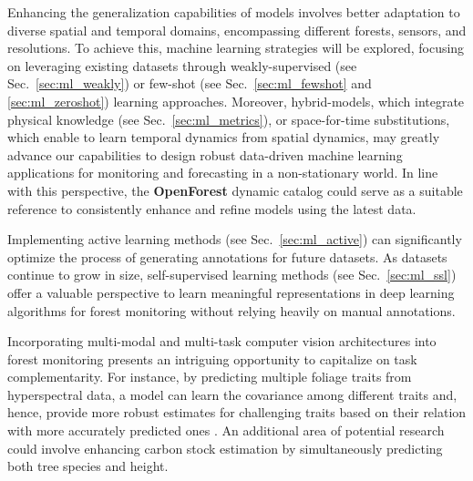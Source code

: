 \documentclass{CUP-JNL-DTM}%
\theoremstyle{definition}
\numberwithin{equation}{section}
\begin{document}
Enhancing the generalization capabilities of models involves better adaptation to diverse spatial and temporal domains, encompassing different forests, sensors, and resolutions. To achieve this, machine learning strategies will be explored, focusing on leveraging existing datasets through weakly-supervised (see Sec.~\ref{sec:ml_weakly}) or few-shot (see Sec.~\ref{sec:ml_fewshot} and \ref{sec:ml_zeroshot}) learning approaches. Moreover, hybrid-models, which integrate physical knowledge (see Sec.~\ref{sec:ml_metrics}), or space-for-time substitutions, which enable to learn temporal dynamics from spatial dynamics, may greatly advance our capabilities to design robust data-driven machine learning applications for monitoring and forecasting in a non-stationary world.
In line with this perspective, the \textbf{OpenForest} dynamic catalog could serve as a suitable reference to consistently enhance and refine models using the latest data.

Implementing active learning methods (see Sec.~\ref{sec:ml_active}) can significantly optimize the process of generating annotations for future datasets. As datasets continue to grow in size, self-supervised learning methods (see Sec.~\ref{sec:ml_ssl}) offer a valuable perspective to learn meaningful representations in deep learning algorithms for forest monitoring without relying heavily on manual annotations.

Incorporating multi-modal and multi-task computer vision architectures into forest monitoring presents an intriguing opportunity to capitalize on task complementarity. 
For instance, by predicting multiple foliage traits from hyperspectral data, a model can learn the covariance among different traits and, hence, provide more robust estimates for challenging traits based on their relation with more accurately predicted ones \cite{cherif_spectra_2023, schiller_deep_2021}. %
An additional area of potential research could involve enhancing carbon stock estimation by simultaneously predicting both tree species and height.
\end{document}
